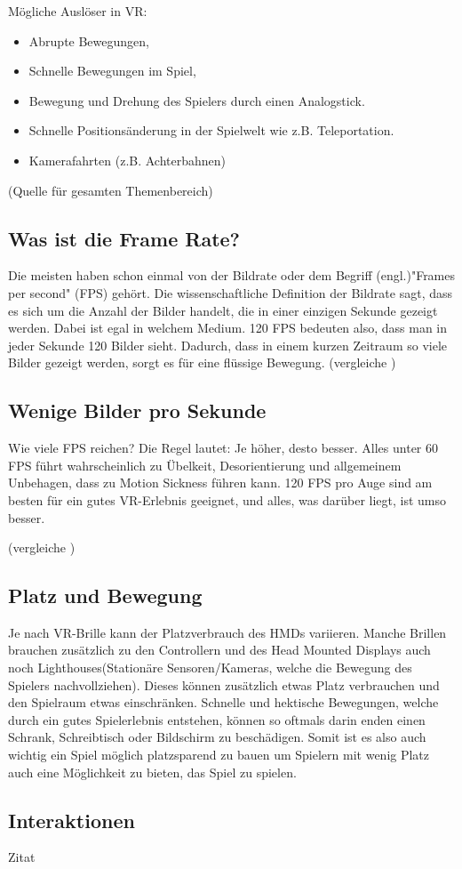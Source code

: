 \vspace{1cm}
Mögliche Auslöser in VR:
\begin{itemize}
	\item Abrupte Bewegungen,
	\item Schnelle Bewegungen im Spiel,
	\item Bewegung und Drehung des Spielers durch einen Analogstick.
	\item Schnelle Positionsänderung in der Spielwelt wie z.B. Teleportation.
	\item Kamerafahrten (z.B. Achterbahnen)
\end{itemize}

(Quelle für gesamten Themenbereich)
\cite{_motionsickness}
\cite{_vr_quovadis}


\subsection{Was ist die Frame Rate?}
Die meisten haben schon einmal von der Bildrate oder dem Begriff (engl.)"Frames per second" (FPS) gehört. Die wissenschaftliche Definition der Bildrate sagt, dass es sich um die Anzahl der Bilder handelt, die in einer einzigen Sekunde gezeigt werden. Dabei ist egal in welchem Medium. 120 FPS bedeuten also, dass man in jeder Sekunde 120 Bilder sieht. Dadurch, dass in einem kurzen Zeitraum so viele Bilder gezeigt werden, sorgt es für eine flüssige Bewegung.
(vergleiche \cite{_vr_linde})

\subsection{Wenige Bilder pro Sekunde}
Wie viele FPS reichen?
Die Regel lautet: Je höher, desto besser. Alles unter 60 FPS führt wahrscheinlich zu Übelkeit, Desorientierung und allgemeinem Unbehagen, dass zu Motion Sickness führen kann. 120 FPS pro Auge sind am besten für ein gutes VR-Erlebnis geeignet, und alles, was darüber liegt, ist umso besser.

(vergleiche \cite{_vr_linde})

\subsection{Platz und Bewegung}
Je nach VR-Brille kann der Platzverbrauch des HMDs variieren. Manche Brillen brauchen zusätzlich zu den Controllern und des Head Mounted Displays auch noch Lighthouses(Stationäre Sensoren/Kameras, welche die Bewegung des Spielers nachvollziehen). Dieses können zusätzlich etwas Platz verbrauchen und den Spielraum etwas einschränken. Schnelle und hektische Bewegungen, welche durch ein gutes Spielerlebnis entstehen, können so oftmals darin enden einen Schrank, Schreibtisch oder Bildschirm zu beschädigen. Somit ist es also auch wichtig ein Spiel möglich platzsparend zu bauen um Spielern mit wenig Platz auch eine Möglichkeit zu bieten, das Spiel zu spielen.

\subsection{Interaktionen}
Zitat